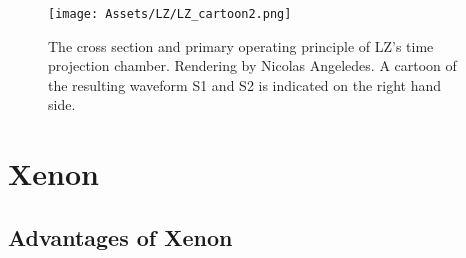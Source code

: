 \begin{figure}
    \centering
    \texttt{[image: Assets/LZ/LZ\_cartoon2.png]}
    \caption[The cross section and primary operating principle of LUX-ZEPLIN's time projection chamber. ]%
    {The cross section and primary operating principle of LZ's time projection chamber. 
    Rendering by Nicolas Angeledes.
    A cartoon of the resulting waveform S1 and S2 is indicated on the right hand side.}
    \label{fig:time_projection_chamber}
\end{figure}

\section{Xenon}
\subsection{Advantages of Xenon}

